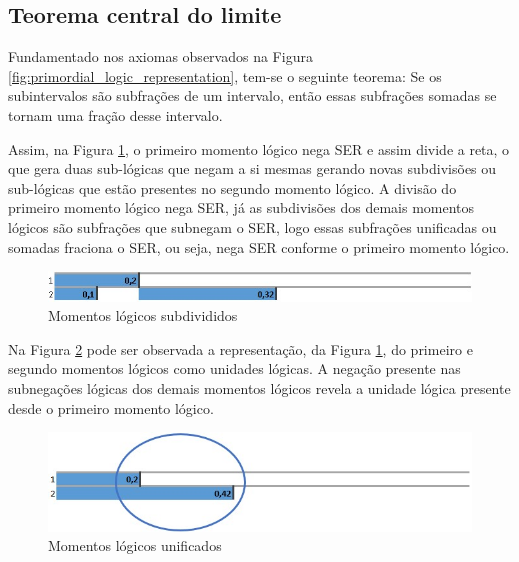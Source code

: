 \subsection{Teorema central do limite}
Fundamentado nos axiomas observados na Figura \ref{fig:primordial_logic_representation}, tem-se o seguinte teorema: Se os subintervalos são subfrações de um intervalo, então essas subfrações somadas se tornam uma fração desse intervalo.

Assim, na Figura \ref{fig:second_logical_moment}, o primeiro momento lógico nega SER e assim divide a reta, o que gera duas sub-lógicas que negam a si mesmas gerando novas subdivisões ou sub-lógicas que estão presentes no segundo momento lógico. A divisão do primeiro momento lógico nega SER, já as subdivisões dos demais momentos lógicos são subfrações que subnegam o SER, logo essas subfrações unificadas ou somadas fraciona o SER, ou seja, nega SER conforme o primeiro momento lógico.
	\begin{figure}[H]
	\caption{Momentos lógicos subdivididos}
	\label{fig:second_logical_moment}
	\centering
	\includegraphics[scale=.85]{sections/images/second_logical_moment.jpg}
	\end{figure}

Na Figura \ref{fig:logical_units} pode ser observada a representação, da Figura \ref{fig:second_logical_moment}, do primeiro e segundo momentos lógicos como unidades lógicas. A negação presente nas subnegações lógicas dos demais momentos lógicos revela a unidade lógica presente desde o primeiro momento lógico.
	\begin{figure}[H]
	\caption{Momentos lógicos unificados}
	\label{fig:logical_units}
	\centering
	\includegraphics[scale=.85]{sections/images/logical_units.jpg}
	\end{figure}

